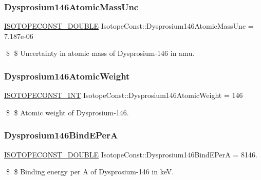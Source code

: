 \subsubsection{\texorpdfstring{Dysprosium146\+Atomic\+Mass\+Unc}{Dysprosium146AtomicMassUnc}}
{\footnotesize\ttfamily \mbox{\hyperlink{group___isotope_const-_macros_ga8f45a7272ce02c0b4c65c44636ed719a}{I\+S\+O\+T\+O\+P\+E\+C\+O\+N\+S\+T\+\_\+\+D\+O\+U\+B\+LE}} Isotope\+Const\+::\+Dysprosium146\+Atomic\+Mass\+Unc = 7.\+187e-\/06}

\$ \$ Uncertainty in atomic mass of Dysprosium-\/146 in amu. \mbox{\label{group___isotope_const-_dysprosium-_dy146_ga3c3f0e6e69e2ddefc9f4a045946554bf}} 
\subsubsection{\texorpdfstring{Dysprosium146\+Atomic\+Weight}{Dysprosium146AtomicWeight}}
{\footnotesize\ttfamily \mbox{\hyperlink{group___isotope_const-_macros_ga5f18360b3e99483a35c32d789e62621c}{I\+S\+O\+T\+O\+P\+E\+C\+O\+N\+S\+T\+\_\+\+I\+NT}} Isotope\+Const\+::\+Dysprosium146\+Atomic\+Weight = 146}

\$ \$ Atomic weight of Dysprosium-\/146. \mbox{\label{group___isotope_const-_dysprosium-_dy146_ga13e9434b1deb0b993b77c0868c1e2822}} 
\subsubsection{\texorpdfstring{Dysprosium146\+Bind\+E\+PerA}{Dysprosium146BindEPerA}}
{\footnotesize\ttfamily \mbox{\hyperlink{group___isotope_const-_macros_ga8f45a7272ce02c0b4c65c44636ed719a}{I\+S\+O\+T\+O\+P\+E\+C\+O\+N\+S\+T\+\_\+\+D\+O\+U\+B\+LE}} Isotope\+Const\+::\+Dysprosium146\+Bind\+E\+PerA = 8146.}

\$ \$ Binding energy per A of Dysprosium-\/146 in keV. \mbox{\label{group___isotope_const-_dysprosium-_dy146_ga0be79cb0f218c5602711cd6a1c447b6f}} 
